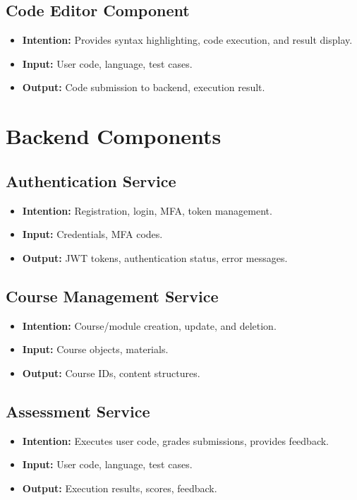 \documentclass[a4paper, 11pt]{scrreprt}
\begin{document}

\subsection{Code Editor Component}
\begin{itemize}
    \item \textbf{Intention:} Provides syntax highlighting, code execution, and result display.
    \item \textbf{Input:} User code, language, test cases.
    \item \textbf{Output:} Code submission to backend, execution result.
\end{itemize}

\section{Backend Components}

\subsection{Authentication Service}
\begin{itemize}
    \item \textbf{Intention:} Registration, login, MFA, token management.
    \item \textbf{Input:} Credentials, MFA codes.
    \item \textbf{Output:} JWT tokens, authentication status, error messages.
\end{itemize}

\subsection{Course Management Service}
\begin{itemize}
    \item \textbf{Intention:} Course/module creation, update, and deletion.
    \item \textbf{Input:} Course objects, materials.
    \item \textbf{Output:} Course IDs, content structures.
\end{itemize}

\subsection{Assessment Service}
\begin{itemize}
    \item \textbf{Intention:} Executes user code, grades submissions, provides feedback.
    \item \textbf{Input:} User code, language, test cases.
    \item \textbf{Output:} Execution results, scores, feedback.
\end{itemize}
\end{document}
